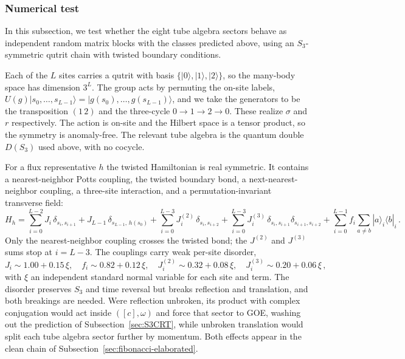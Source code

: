 \documentclass[11pt]{article}
\numberwithin{equation}{section}
\begin{document}
\subsubsection{Numerical test}
\label{sec:S3numerics}

In this subsection, we test whether the eight tube algebra sectors behave as independent random
matrix blocks with the classes predicted above, using an $S_3$-symmetric qutrit chain with twisted
boundary conditions.

Each of the $L$ sites carries a qutrit with
basis $\{|0\rangle,|1\rangle,|2\rangle\}$, so the many-body space has dimension $3^L$. The group
acts by permuting the on-site labels,
$U(g)|s_{0},\dots,s_{L-1}\rangle = |g(s_{0}),\dots,g(s_{L-1})\rangle$, and we take the generators to be the
transposition $(1\,2)$ and the three-cycle $0 \to 1 \to 2 \to 0$. These realize $\sigma$ and $r$
respectively. The action is on-site and the
Hilbert space is a tensor product, so the symmetry is anomaly-free. The relevant tube algebra is
the quantum double $D(S_3)$ used above, with no cocycle.

For a flux representative $h$ the twisted Hamiltonian is real symmetric. It contains a
nearest-neighbor Potts coupling, the twisted boundary bond, a next-nearest-neighbor coupling, a
three-site interaction, and a permutation-invariant transverse field:
\begin{equation}
  H_h = \sum_{i=0}^{L-2} J_i\, \delta_{s_i,s_{i+1}}
      + J_{L-1}\, \delta_{s_{L-1},\,h(s_0)}
      + \sum_{i=0}^{L-3} J^{(2)}_i\, \delta_{s_i,s_{i+2}}
      + \sum_{i=0}^{L-3} J^{(3)}_i\, \delta_{s_i,s_{i+1}} \delta_{s_{i+1},s_{i+2}}
      + \sum_{i=0}^{L-1} f_i \sum_{a \neq b} |a\rangle_i \langle b|_i \,.
  \label{eq:S3ham}
\end{equation}
Only the nearest-neighbor coupling crosses the twisted bond; the $J^{(2)}$ and $J^{(3)}$ sums stop at $i=L-3$. The couplings carry weak per-site disorder,
\begin{equation}
  J_i \sim 1.00 + 0.15\,\xi, \quad
  f_i \sim 0.82 + 0.12\,\xi, \quad
  J^{(2)}_i \sim 0.32 + 0.08\,\xi, \quad
  J^{(3)}_i \sim 0.20 + 0.06\,\xi \,,
  \label{eq:S3disorder}
\end{equation}
with $\xi$ an independent standard normal variable for each site and term. The disorder preserves
$S_3$ and time reversal but breaks reflection and translation, and both breakings are needed. Were
reflection unbroken, its product with complex conjugation would act inside $([c],\omega)$ and force
that sector to GOE, washing out the prediction of Subsection~\ref{sec:S3CRT}, while unbroken
translation would split each tube algebra sector further by momentum. Both effects appear in the clean chain of
Subsection~\ref{sec:fibonacci-elaborated}.
\end{document}
